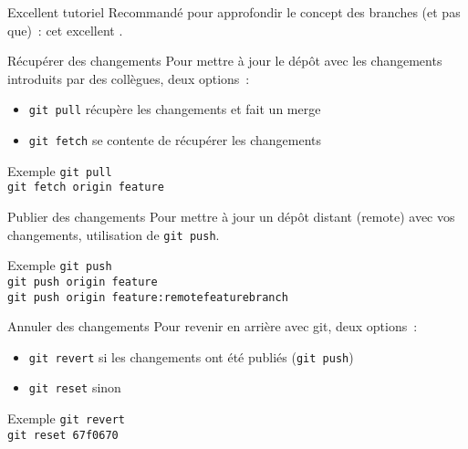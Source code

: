 \begin{frame}{Excellent tutoriel}
  Recommandé pour approfondir le concept des branches (et pas que)~: cet excellent .
\end{frame}

\begin{frame}{Récupérer des changements}
  Pour mettre à jour le dépôt avec les changements introduits par des collègues, deux options~:

  \begin{itemize}[<+->]
    \item \texttt{git pull} récupère les changements et fait un merge
    \item \texttt{git fetch} se contente de récupérer les changements
  \end{itemize}

  \begin{exampleblock}{Exemple}
    \texttt{git pull}\\
    \texttt{git fetch origin feature}
  \end{exampleblock}
\end{frame}

\begin{frame}{Publier des changements}
  Pour mettre à jour un dépôt distant (remote) avec vos changements, utilisation de \texttt{git push}.

  \begin{exampleblock}{Exemple}
    \texttt{git push}\\
    \texttt{git push origin feature}\\
    \texttt{git push origin feature:remotefeaturebranch}
  \end{exampleblock}
\end{frame}

\begin{frame}{Annuler des changements}
  Pour revenir en arrière avec git, deux options~:

  \begin{itemize}[<+->]
    \item \texttt{git revert} si les changements ont été publiés (\texttt{git push})
    \item \texttt{git reset} sinon
  \end{itemize}

  \begin{exampleblock}{Exemple}
    \texttt{git revert}\\
    \texttt{git reset 67f0670}
  \end{exampleblock}
\end{frame}

